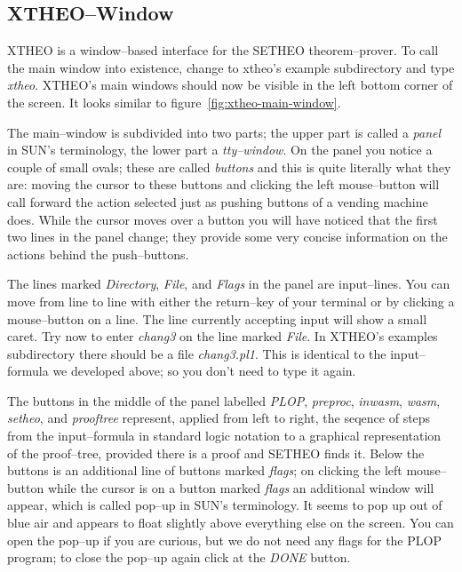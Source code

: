 \subsection{XTHEO--Window} 
XTHEO is a window--based interface for the SETHEO theorem--prover. To call the main window into existence,
change to xtheo's example subdirectory and type {\it xtheo\/}. XTHEO's main windows should now be visible
in the left bottom corner of the screen. It looks similar to figure~\ref{fig:xtheo-main-window}.
%


The main--window is subdivided into two parts; the upper part is called a {\it panel\/} in SUN's terminology,
the lower part a {\it tty--window\/}. On the panel you notice a couple of small ovals; these are called
{\it buttons\/} and this is quite literally what they are: moving the cursor to these buttons and clicking
the left mouse--button will call forward the action selected just as pushing buttons of a vending
machine does. 
While the cursor moves over a button you will have noticed that the first two lines in the panel change;
they provide some very concise information on the actions behind the push--buttons.

The lines marked {\it Directory\/}, {\it File\/}, and {\it Flags\/} in the panel are input--lines.
You can move from line to line with either the return--key of your terminal or by clicking a
mouse--button on a line. The line currently accepting input will show a small caret. 
Try now to enter {\it chang3\/} on the line marked {\it File\/}.
In XTHEO's examples subdirectory there should be a file {\it chang3.pl1\/}. This is identical to
the input--formula we developed above; so you don't need to type it again.

The buttons in the middle of the panel labelled {\it PLOP\/}, {\it preproc\/}, {\it inwasm\/}, {\it wasm\/}, {\it setheo\/}, and
{\it prooftree\/} represent, applied from left to right, the seqence of steps from the 
input--formula in standard logic notation to a graphical representation of the proof--tree, provided 
there is a proof and SETHEO finds it. Below the buttons is an additional line of buttons
marked {\it flags\/}; on clicking the left mouse--button while the cursor is on a button marked {\it flags\/}
an additional window will appear, which is called pop--up in SUN's terminology.
It seems to pop up out of blue air and appears to float slightly above everything else
on the screen.
You can open the pop--up if you are curious, but we do not need any flags for the PLOP program;
to close the pop--up again click at the {\it DONE\/} button. 
